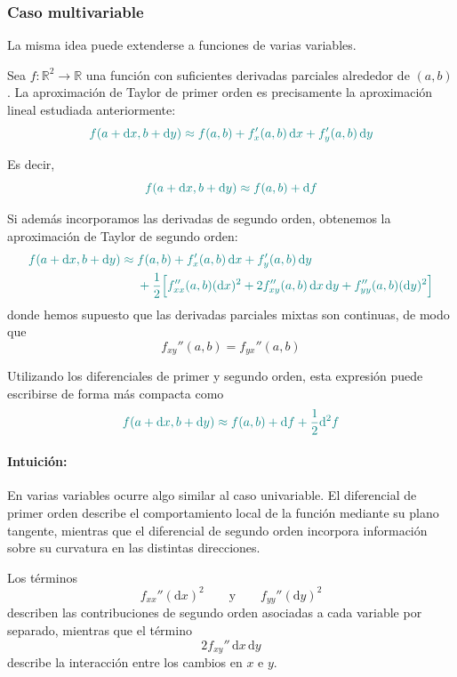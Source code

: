 \documentclass{article}
\begin{document}
\subsubsection*{Caso multivariable}

La misma idea puede extenderse a funciones de varias variables.

Sea \(f:\mathbb{R}^2\to\mathbb{R}\) una función con suficientes derivadas parciales alrededor de \((a,b)\).
La aproximación de Taylor de primer orden es precisamente la aproximación lineal estudiada anteriormente:
\[
\color{teal}
f(a+\mathrm{d}x,b+\mathrm{d}y)
\approx
f(a,b)
+
f_x'(a,b)\,\mathrm{d}x
+
f_y'(a,b)\,\mathrm{d}y
\]

Es decir,
\[
\color{teal}
f(a+\mathrm{d}x,b+\mathrm{d}y)
\approx
f(a,b)
+
\mathrm{d}f
\]

Si además incorporamos las derivadas de segundo orden, obtenemos la aproximación de Taylor de segundo orden:
\[
\color{teal}
\begin{aligned}
f(a+\mathrm{d}x,b+\mathrm{d}y)
\approx\;&
f(a,b)
+
f_x'(a,b)\,\mathrm{d}x
+
f_y'(a,b)\,\mathrm{d}y
\\
&+
\frac{1}{2}
\Big[
f_{xx}''(a,b)(\mathrm{d}x)^2
+
2f_{xy}''(a,b)\,\mathrm{d}x\,\mathrm{d}y
+
f_{yy}''(a,b)(\mathrm{d}y)^2
\Big]
\end{aligned}
\]
donde hemos supuesto que las derivadas parciales mixtas son continuas, de modo que
\[
f_{xy}''(a,b)=f_{yx}''(a,b)
\]

Utilizando los diferenciales de primer y segundo orden, esta expresión puede escribirse de forma más compacta como
\[
\color{teal}
f(a+\mathrm{d}x,b+\mathrm{d}y)
\approx
f(a,b)
+
\mathrm{d}f
+
\frac{1}{2}\mathrm{d}^2f
\]

\paragraph*{Intuición:}
En varias variables ocurre algo similar al caso univariable.
El diferencial de primer orden describe el comportamiento local de la función mediante su plano tangente, mientras que el diferencial de segundo orden incorpora información sobre su curvatura en las distintas direcciones.

Los términos
\[
f_{xx}''(\mathrm{d}x)^2
\qquad\text{y}\qquad
f_{yy}''(\mathrm{d}y)^2
\]
describen las contribuciones de segundo orden asociadas a cada variable por separado, mientras que el término
\[
2f_{xy}''\,\mathrm{d}x\,\mathrm{d}y
\]
describe la interacción entre los cambios en \(x\) e \(y\).
\end{document}
